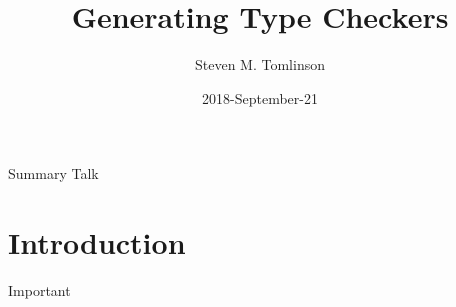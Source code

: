 \documentclass{UoYCSproject}
\author{Steven M. Tomlinson}
\title{Generating Type Checkers}
\date{2018-September-21}
\begin{document}
\maketitle

\begin{summary}
Summary Talk
\end{summary}

\chapter{Introduction}
\label{cha:Introduction}
Important\cite{zobel2015writing}


\listoffigures
\listoftables

\printbibliography
\end{document}
